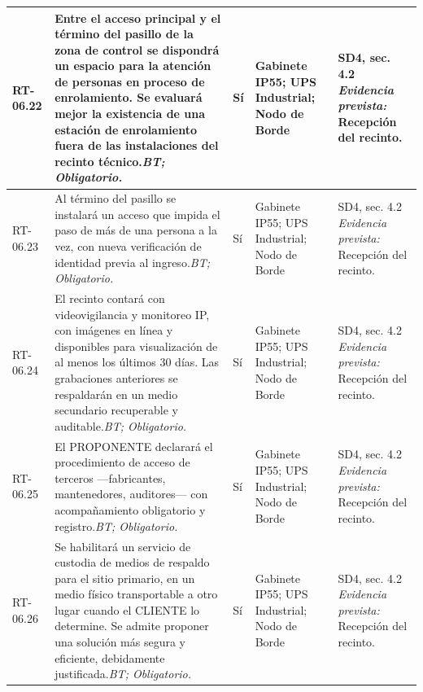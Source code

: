 \begin{paginaHorizontalSynaptix}
\begin{longtable}{|L{0.09\AnchoMatrizTDoce}|L{0.385\AnchoMatrizTDoce}|L{0.065\AnchoMatrizTDoce}|L{0.18\AnchoMatrizTDoce}|L{0.28\AnchoMatrizTDoce}|}
RT-\allowbreak{}06.\allowbreak{}22 &
Entre el acceso principal y el término del pasillo de la zona de control se dispondrá un espacio para la atención de personas en proceso de enrolamiento. Se evaluará mejor la existencia de una estación de enrolamiento fuera de las instalaciones del recinto técnico.\newline\textit{BT; Obligatorio.} &
Sí &
Gabinete IP55; UPS Industrial; Nodo de Borde &
SD4, sec. 4.2 \newline\textit{Evidencia prevista:} Recepción del recinto. \\ \hline

RT-\allowbreak{}06.\allowbreak{}23 &
Al término del pasillo se instalará un acceso que impida el paso de más de una persona a la vez, con nueva verificación de identidad previa al ingreso.\newline\textit{BT; Obligatorio.} &
Sí &
Gabinete IP55; UPS Industrial; Nodo de Borde &
SD4, sec. 4.2 \newline\textit{Evidencia prevista:} Recepción del recinto. \\ \hline

RT-\allowbreak{}06.\allowbreak{}24 &
El recinto contará con videovigilancia y monitoreo IP, con imágenes en línea y disponibles para visualización de al menos los últimos 30 días. Las grabaciones anteriores se respaldarán en un medio secundario recuperable y auditable.\newline\textit{BT; Obligatorio.} &
Sí &
Gabinete IP55; UPS Industrial; Nodo de Borde &
SD4, sec. 4.2 \newline\textit{Evidencia prevista:} Recepción del recinto. \\ \hline

RT-\allowbreak{}06.\allowbreak{}25 &
El PROPONENTE declarará el procedimiento de acceso de terceros —fabricantes, mantenedores, auditores— con acompañamiento obligatorio y registro.\newline\textit{BT; Obligatorio.} &
Sí &
Gabinete IP55; UPS Industrial; Nodo de Borde &
SD4, sec. 4.2 \newline\textit{Evidencia prevista:} Recepción del recinto. \\ \hline

RT-\allowbreak{}06.\allowbreak{}26 &
Se habilitará un servicio de custodia de medios de respaldo para el sitio primario, en un medio físico transportable a otro lugar cuando el CLIENTE lo determine. Se admite proponer una solución más segura y eficiente, debidamente justificada.\newline\textit{BT; Obligatorio.} &
Sí &
Gabinete IP55; UPS Industrial; Nodo de Borde &
SD4, sec. 4.2 \newline\textit{Evidencia prevista:} Recepción del recinto. \\ \hline


\end{longtable}
\end{paginaHorizontalSynaptix}
